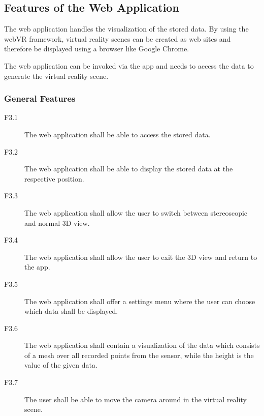 \subsection{Features of the Web Application}

The web application handles the visualization of the stored data. By using the webVR framework, virtual reality scenes can be created as web sites and therefore be displayed using a browser like Google Chrome.

The web application can be invoked via the app and needs to access the data to generate the virtual reality scene. 

\subsubsection{General Features}
 
  \begin{description}
    \item[F3.1] The web application shall be able to access the stored data.
    \item[F3.2] The web application shall be able to display the stored data at the respective position. 
    
	\item[F3.3] The web application shall allow the user to switch between stereoscopic and normal 3D view.
    
	\item[F3.4] The web application shall allow the user to exit the 3D view and return to the app.
    
	\item[F3.5] The web application shall offer a settings menu where the user can choose which data shall be displayed.    
    
    \item[F3.6] The web application shall contain a visualization of the data which consists of a mesh over all recorded points from the sensor, while the height is the value of the given data.
    
    \item[F3.7] The user shall be able to move the camera around in the virtual reality scene. 
    
    
    
  \end{description}


